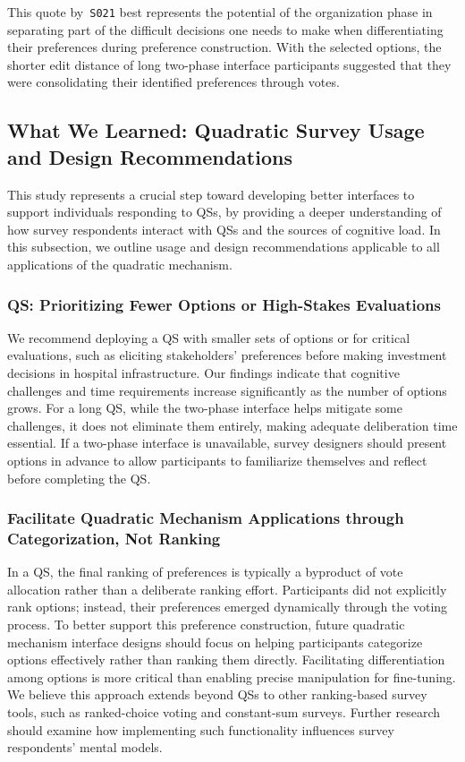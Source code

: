 {This quote by~\texttt{S021} best represents the potential of the organization phase in separating part of the difficult decisions one needs to make when differentiating their preferences during preference construction. With the selected options, the shorter edit distance of long two-phase interface participants suggested that they were consolidating their identified preferences through votes.



\subsection{What We Learned: Quadratic Survey Usage and Design Recommendations}
This study represents a crucial step toward developing better interfaces to support individuals responding to QSs, by providing a deeper understanding of how survey respondents interact with QSs and the sources of cognitive load. In this subsection, we outline usage and design recommendations applicable to all applications of the quadratic mechanism.

\subsubsection{QS: Prioritizing Fewer Options or High-Stakes Evaluations}
We recommend deploying a QS with smaller sets of options or for critical evaluations, such as eliciting stakeholders' preferences before making investment decisions in hospital infrastructure. Our findings indicate that cognitive challenges and time requirements increase significantly as the number of options grows. For a long QS, while the two-phase interface helps mitigate some challenges, it does not eliminate them entirely, making adequate deliberation time essential. If a two-phase interface is unavailable, survey designers should present options in advance to allow participants to familiarize themselves and reflect before completing the QS.

\subsubsection{Facilitate Quadratic Mechanism Applications through Categorization, Not Ranking}
In a QS, the final ranking of preferences is typically a byproduct of vote allocation rather than a deliberate ranking effort. Participants did not explicitly rank options; instead, their preferences emerged dynamically through the voting process. To better support this preference construction, future quadratic mechanism interface designs should focus on helping participants categorize options effectively rather than ranking them directly. Facilitating differentiation among options is more critical than enabling precise manipulation for fine-tuning. We believe this approach extends beyond QSs to other ranking-based survey tools, such as ranked-choice voting and constant-sum surveys. Further research should examine how implementing such functionality influences survey respondents' mental models.


}
